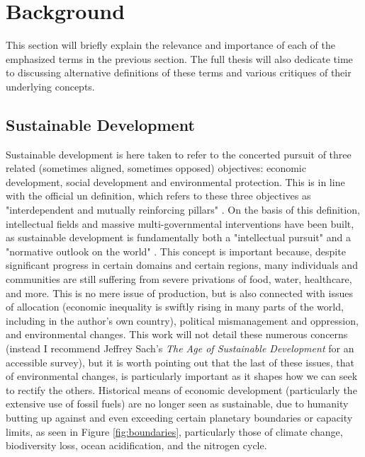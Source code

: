 \documentclass[notitlepage]{article}
\begin{document}
\section{Background} \label{sec:background}

This section will briefly explain the relevance and importance of each of the emphasized terms in the previous section. The full thesis will also dedicate time to discussing alternative definitions of these terms and various critiques of their underlying concepts.

\subsection{Sustainable Development} \label{sec:sustain}

Sustainable development is here taken to refer to the concerted pursuit of three related (sometimes aligned, sometimes opposed) objectives: economic development, social development and environmental protection. This is in line with the official \ac{un} definition, which refers to these three objectives as "interdependent and mutually reinforcing pillars" \cite{worldsummitonsustainabledevelopmentPlanImplementationWorld2002}. On the basis of this definition, intellectual fields and massive multi-governmental interventions have been built, as sustainable development is fundamentally both a "intellectual pursuit" and a "normative outlook on the world" \cite{sachsAgeSustainableDevelopment2015}. This concept is important because, despite significant progress in certain domains and certain regions, many individuals and communities are still suffering from severe privations of food, water, healthcare, and more. This is no mere issue of production, but is also connected with issues of allocation (economic inequality is swiftly rising in many parts of the world, including in the author's own country), political mismanagement and oppression, and environmental changes. This work will not detail these numerous concerns (instead I recommend Jeffrey Sach's \textit{The Age of Sustainable Development} for an accessible survey), but it is worth pointing out that the last of these issues, that of environmental changes, is particularly important as it shapes how we can seek to rectify the others. Historical means of economic development (particularly the extensive use of fossil fuels) are no longer seen as sustainable, due to humanity butting up against and even exceeding certain planetary boundaries or capacity limits, as seen in Figure \ref{fig:boundaries}, particularly those of climate change, biodiversity loss, ocean acidification, and the nitrogen cycle.
\end{document}
